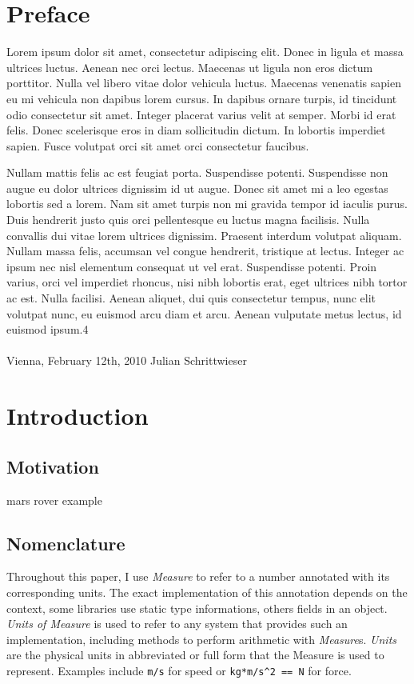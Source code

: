 \documentclass[12pt,oneside,a4paper]{scrbook}
\begin{document}
\chapter*{Preface}

Lorem ipsum dolor sit amet, consectetur adipiscing elit. Donec in ligula et massa ultrices luctus. Aenean nec orci lectus. Maecenas ut ligula non eros dictum porttitor. Nulla vel libero vitae dolor vehicula luctus. Maecenas venenatis sapien eu mi vehicula non dapibus lorem cursus. In dapibus ornare turpis, id tincidunt odio consectetur sit amet. Integer placerat varius velit at semper. Morbi id erat felis. Donec scelerisque eros in diam sollicitudin dictum. In lobortis imperdiet sapien. Fusce volutpat orci sit amet orci consectetur faucibus.

Nullam mattis felis ac est feugiat porta. Suspendisse potenti. Suspendisse non augue eu dolor ultrices dignissim id ut augue. Donec sit amet mi a leo egestas lobortis sed a lorem. Nam sit amet turpis non mi gravida tempor id iaculis purus. Duis hendrerit justo quis orci pellentesque eu luctus magna facilisis. Nulla convallis dui vitae lorem ultrices dignissim. Praesent interdum volutpat aliquam. Nullam massa felis, accumsan vel congue hendrerit, tristique at lectus. Integer ac ipsum nec nisl elementum consequat ut vel erat. Suspendisse potenti. Proin varius, orci vel imperdiet rhoncus, nisi nibh lobortis erat, eget ultrices nibh tortor ac est. Nulla facilisi. Aenean aliquet, dui quis consectetur tempus, nunc elit volutpat nunc, eu euismod arcu diam et arcu. Aenean vulputate metus lectus, id euismod ipsum.4
\\ \\
Vienna, February 12th, 2010  \hfill Julian Schrittwieser

\singlespacing
\tableofcontents

\chapter{Introduction}
\setcounter{page}{1}

\section{Motivation}
mars rover example

\section{Nomenclature}
Throughout this paper, I use \emph{Measure} to refer to a number annotated with its corresponding units. The exact implementation of this annotation depends on the context, some libraries use static type informations, others fields in an object. \emph{Units of Measure} is used to refer to any system that provides such an implementation, including methods to perform arithmetic with \emph{Measure}s. \emph{Units} are the physical units in abbreviated or full form that the Measure is used to represent. Examples include \verb|m/s| for speed or \verb|kg*m/s^2 == N| for force.
\end{document}
